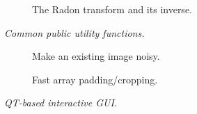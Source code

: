 \documentclass[nohyper, %
               ]{tufte-handout}
\begin{document}
\begin{description}
    \begin{description}
      \item[] The Radon transform and its inverse.
    \end{description}
    \item[\pyv{skimage.util}] \textit{Common public utility functions.}
    \begin{description}
      \item[] Make an existing image noisy.
      \item[] Fast array padding/cropping.
    \end{description}
    \item[\pyv{skimage.viewer}] \textit{QT-based interactive GUI.}
  \end{description}



\end{document}
